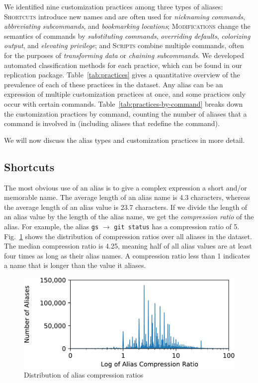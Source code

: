 \documentclass[smallextended,natbib]{svjour3}
\newcommand{\alias}[2]{{\texttt{#1} $\rightarrow$ \texttt{#2}}}
\begin{document}
We identified nine customization practices among three types of aliases:
\textsc{Shortcuts} introduce new names and are often used for \emph{nicknaming commands}, \emph{abbreviating subcommands}, and \emph{bookmarking locations};
\textsc{Modifications} change the semantics of commands by \emph{substituting commands}, \emph{overriding defaults}, \emph{colorizing output}, and \emph{elevating privilege};
and \textsc{Scripts} combine multiple commands, often for the purposes of \emph{transforming data} or \emph{chaining subcommands}.
We developed automated classification methods for each practice, which can be found in our replication package.
Table~\ref{tab:practices} gives a quantitative overview of the prevalence of each of these practices in the dataset.
Any alias can be an expression of multiple customization practices at once, and some practices only occur with certain commands.
Table~\ref{tab:practices-by-command} breaks down the customization practices by command, counting the number of aliases that a command is involved in (including aliases that redefine the command).

We will now discuss the alias types and customization practices in more detail.



\subsection{Shortcuts}

The most obvious use of an alias is to give a complex expression a short and/or memorable name.
The average length of an alias name is 4.3 characters, whereas the average length of an alias value is 23.7 characters.
If we divide the length of an alias value by the length of the alias name, we get the \emph{compression ratio} of the alias.
For example, the alias \alias{gs}{git status} has a compression ratio of 5.
Fig.~\ref{fig:compression} shows the distribution of compression ratios over all aliases in the dataset.
The median compression ratio is 4.25, meaning half of all alias values are at least four times as long as their alias names.
A compression ratio less than 1 indicates a name that is longer than the value it aliases.

\begin{figure}
    \centering
    \includegraphics[width=0.75\columnwidth]{fig-compression.pdf}
    \caption{Distribution of alias compression ratios}
    \label{fig:compression}
\end{figure}
\end{document}
